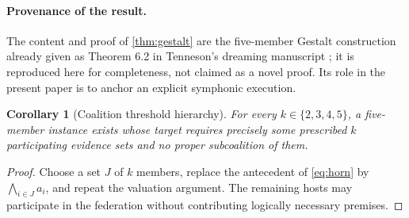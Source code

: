 \documentclass[11pt,letterpaper]{article}
\newtheorem{corollary}[theorem]{Corollary}
\theoremstyle{definition}
\theoremstyle{remark}
\begin{document}
\paragraph{Provenance of the result.} The content and proof of \cref{thm:gestalt} are the five-member Gestalt construction already given as Theorem 6.2 in Tenneson's dreaming manuscript \cite{tenneson-dreaming}; it is reproduced here for completeness, not claimed as a novel proof. Its role in the present paper is to anchor an explicit symphonic execution.

\begin{corollary}[Coalition threshold hierarchy]
For every $k\in\{2,3,4,5\}$, a five-member instance exists whose target requires precisely some prescribed $k$ participating evidence sets and no proper subcoalition of them.
\end{corollary}
\begin{proof}
Choose a set $J$ of $k$ members, replace the antecedent of \eqref{eq:horn} by $\bigwedge_{i\in J}a_i$, and repeat the valuation argument. The remaining hosts may participate in the federation without contributing logically necessary premises.
\end{proof}
\end{document}

